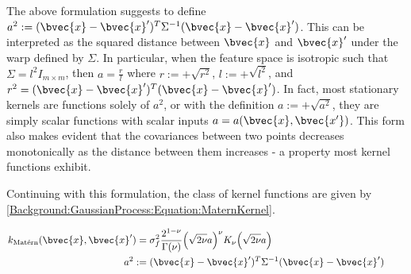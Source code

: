 			The above formulation suggests to define $a^{2} := (\bvec{x} - \bvec{x}')^{T} \Sigma^{-1} (\bvec{x} - \bvec{x}')$. This can be interpreted as the squared distance between $\bvec{x}$ and $\bvec{x}'$ under the warp defined by $\Sigma$. In particular, when the feature space is isotropic such that $\Sigma = l^{2} I_{m \times m}$, then $a = \frac{r}{l}$ where $r := +\sqrt{r^{2}}$, $l := +\sqrt{l^{2}}$, and $r^{2} = (\bvec{x} - \bvec{x}')^{T} (\bvec{x} - \bvec{x}')$. In fact, most stationary kernels are functions solely of $a^{2}$, or with the definition $a := +\sqrt{a^{2}}$, they are simply scalar functions with scalar inputs $a = a (\bvec{x}, \bvec{x'})$. This form also makes evident that the covariances between two points decreases monotonically as the distance between them increases - a property most kernel functions exhibit.
			
			Continuing with this formulation, the \matern class of kernel functions are given by \eqref{Background:GaussianProcess:Equation:MaternKernel}.
			
			\begin{equation}
				\left.
					\begin{aligned}
						k_{\mathrm{\maternmath}}(\bvec{x}, \bvec{x}') =& \; \sigma_{f}^{2} \frac{2^{1 - \nu}}{\Gamma(\nu)} \Big( \sqrt{2 \nu} a \Big)^{\nu} K_{\nu}\Big( \sqrt{2 \nu} a \Big) \\
						a^{2} :=& \; (\bvec{x} - \bvec{x}')^{T} \Sigma^{-1} (\bvec{x} - \bvec{x}')
					\end{aligned}
				\qquad \right.
			\label{Background:GaussianProcess:Equation:MaternKernel}
			\end{equation}
						
